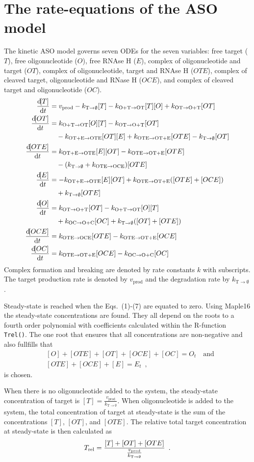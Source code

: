 \documentclass[a4paper,11pt]{article}
\newcommand{\kmo}{k_{\mathrm{OT \to O+T}}}
\newcommand{\kOpT}{k_{\mathrm{O+T \to OT}}}
\newcommand{\kmt}{k_{\mathrm{OTE \to OT+E}}}
\newcommand{\kt}{k_{\mathrm{OT+E \to OTE}}}
\newcommand{\kE}{k_{\mathrm{OTE \to OCE}}}
\newcommand{\kD}{k_{\mathrm{OC \to O+C}}}
\newcommand{\vp}{v_{\mathrm{prod}}}
\newcommand{\vd}{k_{\mathrm{T \to \emptyset}}}
\newcommand{\Trel}{T_{\rm{rel}}}
\begin{document}
\section{The rate-equations of the ASO model}
The kinetic ASO model governs seven ODEs for the seven variables: free target ($T$), free oligonucleotide ($O$), free RNAse H ($E$), complex of oligonucleotide and target ($OT$), complex of oligonucleotide, target and RNAse H  ($OTE$), complex of cleaved target, oligonucleotide and RNase H ($OCE$), and complex of cleaved target and oligonucleotide  ($OC$).
\begin{align}
\frac{\dif [T]}{\dif t} &= \vp - \vd [T]-\kOpT [T] [O] +\kmo [OT] \\
\frac{\dif [OT]}{\dif t} &= \kOpT [O][T]-\kmo[OT] \nonumber \\
	& \quad -\kt[OT][E]+\kmt [OTE]-\vd[OT] \\
\frac{\dif [OTE]}{\dif t} &= \kt[E][OT]-\kmt[OTE] \nonumber \\
	& \quad -(\vd+\kE)[OTE]\\
\frac{\dif [E]}{\dif t} &= -\kt[E][OT]+\kmt([OTE]+[OCE]) \nonumber \\
	& \quad+\vd[OTE]\\
\frac{\dif [O]}{\dif t}&= \kmo [OT]-\kOpT[O][T] \nonumber  \\
  & \quad +\kD [OC]+\vd([OT]+[OTE])  \\
\frac{\dif [OCE]}{\dif t}& = \kE [OTE]-\kmt [OCE]\\
\frac{\dif [OC]}{\dif t}& = \kmt [OCE]-\kD [OC]
\end{align}
Complex formation and breaking are denoted by rate constants $k$ with subscripts. The target production rate is denoted by $\vp$ and the degradation rate by $\vd$.

Steady-state is reached when the Eqs.~(1)-(7) are equated to zero. Using Maple16 the steady-state concentrations are found. They all depend on the roots to a fourth order polynomial with coefficients calculated within the R-function \texttt{Trel()}. The one root that ensures that all concentrations are non-negative and also fullfills that
\begin{align*}
 &[O]+[OTE]+[OT]+[OCE]+[OC] = O_t \quad \mathrm{and}\\ 
 &[OTE]+[OCE]+[E] = E_t \enspace,
\end{align*}
is chosen. 

When there is no oligonucleotide added to the system, the steady-state concentration of target is $[T]=\frac{\vp}{ \vd}$. When oligonucleotide is added to the system, the total concentration of target at steady-state is the sum of the concentrations $[T]$, $[OT]$, and $[OTE]$. The relative total target concentration at steady-state is then calculated as 
\begin{equation}
\Trel = \frac{[T]+[OT]+[OTE]}{\frac{\vp}{ \vd}} \enspace.
\end{equation}
\end{document}
